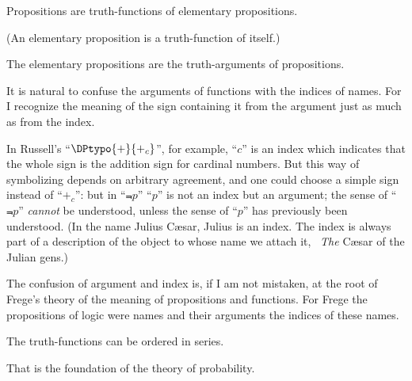 {Propositions are truth-functions of elementary
propositions.

(An elementary proposition is a truth-function
of itself.)}


{The elementary propositions are the truth-arguments
of propositions.}


{It is natural to confuse the arguments of
functions with the indices of names. For I
recognize the meaning of the sign containing it
from the argument just as much as from the
index.

In Russell's ``$\DPtypo{+}{+_{c}}$'', for example, ``$c$'' is an
index which indicates that the whole sign is the
addition sign for cardinal numbers. But this way
of symbolizing depends on arbitrary agreement,
and one could choose a simple sign instead of
``$+_{c}$'': but in ``$\Not{p}$'' ``$p$'' is not an index but
an argument; the sense of ``$\Not{p}$'' \emph{cannot} be understood,
unless the sense of ``$p$'' has previously been
understood. (In the name Julius Cæsar, Julius is
an index. The index is always part of a description
of the object to whose name we attach it, \exempliGratia\ \emph{The}
Cæsar of the Julian gens.)

The confusion of argument and index is, if I
am not mistaken, at the root of Frege's theory
of the meaning of propositions and functions. For
Frege the propositions of logic were names and
their arguments the indices of these names.}


{The truth-functions can be ordered in
series.

That is the foundation of the theory of probability.}
\enlargethispage{-9pt} %

